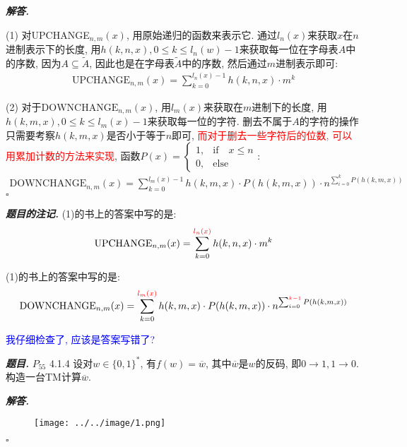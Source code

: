 \documentclass[10pt, a4paper, oneside]{ctexart}
\newenvironment{problem}{\begin{framed}\par\noindent\textbf{\textit{题目. }}}{\end{framed}\par}
\newenvironment{solution}{%
  \par\noindent\textbf{\textit{解答. }}\ignorespaces
}{%
  \hfill\ensuremath{\square}\par %
}
\newenvironment{note}{\par\noindent\textbf{\textit{题目的注记. }}\ignorespaces}{\par}
\begin{document}
\begin{solution}
(1) 对UPCHANGE$_{n,m}(x)$, 用原始递归的函数来表示它. 通过$l_{n}(x)$来获取$x$在$n$进制表示下的长度, 用$h(k,n,x), 0\leq k\leq l_n(w)-1$来获取每一位在字母表$A$中的序数, 因为$A\subseteq \tilde{A}$, 因此也是在字母表$\tilde{A}$中的序数, 然后通过$m$进制表示即可:
\begin{align*}
    \text{UPCHANGE}_{n,m}(x)=\sum_{k=0}^{l_n(x)-1} h(k,n,x)\cdot m^{k}
\end{align*}

(2) 对于$\text{DOWNCHANGE}_{n,m}(x)$, 用$l_{m}(x)$来获取在$m$进制下的长度, 用$h(k,m,x), 0\leq k\leq l_m(x)-1$来获取每一位的字符. 删去不属于$A$的字符的操作只需要考察$h(k,m,x)$是否小于等于$n$即可, \textcolor{red}{而对于删去一些字符后的位数, 可以用累加计数的方法来实现}, 函数$P(x)=\begin{cases}
    1,&\text{if}\quad x\leq n\\
    0,&\text{else}
\end{cases}$:
\begin{align*}
    \text{DOWNCHANGE}_{n,m}(x)=\sum_{k=0}^{l_m(x)-1} h(k,m,x)\cdot P(h(k,m,x)) \cdot n^{\sum_{i=0}^{k} P(h(k,m,x))}
\end{align*}
\end{solution}

\begin{note}
(1)的书上的答案中写的是:
\begin{align*}
    \text{UPCHANGE}_{n,m}(x)=\sum_{k=0}^{\textcolor{red}{l_n(x)}} h(k,n,x)\cdot m^{k}
\end{align*}

(1)的书上的答案中写的是:
\begin{align*}
    \text{DOWNCHANGE}_{n,m}(x)=\sum_{k=0}^{ \textcolor{red}{l_m(x)} } h(k,m,x)\cdot P(h(k,m,x)) \cdot n^{\sum_{i=0}^{ \textcolor{red}{k-1} } P(h(k,m,x))}
\end{align*}

\textcolor{blue}{我仔细检查了, 应该是答案写错了?}
\end{note}


\begin{problem}
    $P_{55}$ 4.1.4 设对$w\in \{0,1\}^*$, 有$f(w)=\overline{w}$, 其中$\overline{w}$是$w$的反码, 即$0\to 1, 1\to 0$. 构造一台TM计算$\overline{w}$.
    \end{problem}
    
    \begin{solution}
    
    \begin{figure}[h]
        \centering
        \texttt{[image: ../../image/1.png]}
    \end{figure}
    \end{solution}
    
\end{document}
